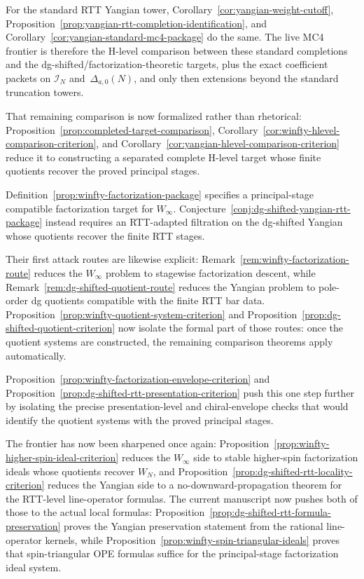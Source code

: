 \begin{remark}
For the standard RTT Yangian tower,
Corollary~\ref{cor:yangian-weight-cutoff},
Proposition~\ref{prop:yangian-rtt-completion-identification}, and
Corollary~\ref{cor:yangian-standard-mc4-package} do the same.
The live MC4 frontier is therefore the H-level comparison between these
standard completions and the dg-shifted/factorization-theoretic targets,
plus the exact coefficient packets on
$\mathcal{I}_N$ and~$\Delta_{a,0}(N)$, and only then extensions beyond
the standard truncation towers.

That remaining comparison is now formalized rather than rhetorical:
Proposition~\ref{prop:completed-target-comparison},
Corollary~\ref{cor:winfty-hlevel-comparison-criterion}, and
Corollary~\ref{cor:yangian-hlevel-comparison-criterion} reduce it to
constructing a separated complete H-level target whose finite quotients
recover the proved principal stages.

Definition~\ref{prop:winfty-factorization-package} specifies a principal-stage compatible factorization target for $W_\infty$.
Conjecture~\ref{conj:dg-shifted-yangian-rtt-package} instead requires an RTT-adapted filtration on the dg-shifted Yangian whose quotients recover the finite RTT stages.

Their first attack routes are likewise explicit:
Remark~\ref{rem:winfty-factorization-route} reduces the
$W_\infty$ problem to stagewise factorization descent, while
Remark~\ref{rem:dg-shifted-quotient-route} reduces the Yangian problem
to pole-order dg quotients compatible with the finite RTT bar data.
Proposition~\ref{prop:winfty-quotient-system-criterion} and
Proposition~\ref{prop:dg-shifted-quotient-criterion} now isolate the
formal part of those routes: once the quotient systems are constructed,
the remaining comparison theorems apply automatically.

Proposition~\ref{prop:winfty-factorization-envelope-criterion} and
Proposition~\ref{prop:dg-shifted-rtt-presentation-criterion} push this
one step further by isolating the precise presentation-level and
chiral-envelope checks that would identify the quotient systems with the
proved principal stages.

The frontier has now been sharpened once again:
Proposition~\ref{prop:winfty-higher-spin-ideal-criterion} reduces the
$W_\infty$ side to stable higher-spin factorization ideals whose
quotients recover $W_N$, and
Proposition~\ref{prop:dg-shifted-rtt-locality-criterion} reduces the
Yangian side to a no-downward-propagation theorem for the RTT-level
line-operator formulas.  The current manuscript now pushes both of
those to the actual local formulas:
Proposition~\ref{prop:dg-shifted-rtt-formula-preservation} proves the
Yangian preservation statement from the rational line-operator kernels,
while Proposition~\ref{prop:winfty-spin-triangular-ideals} proves that
spin-triangular OPE formulas suffice for the principal-stage
factorization ideal system.


\end{remark}
